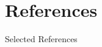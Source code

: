 \section*{References}

\begin{frame}[allowframebreaks]{Selected References}
\scriptsize
\end{frame}



